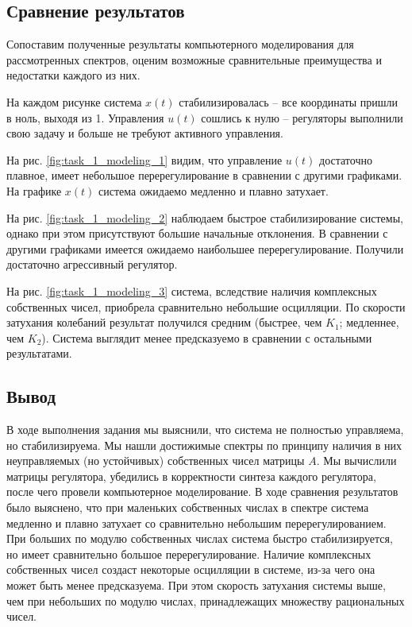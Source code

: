 \documentclass[a4paper, 12pt]{article}
\begin{document}
    \subsection{Сравнение результатов}
    Сопоставим полученные результаты компьютерного моделирования для рассмотренных спектров,
    оценим возможные сравнительные преимущества и недостатки каждого из них.


    На каждом рисунке система $x(t)$ стабилизировалась -- все координаты пришли в ноль, выходя из 1.
    Управления $u(t)$ сошлись к нулю -- регуляторы выполнили свою задачу и больше не требуют
    активного управления.
    

    На рис. \ref{fig:task_1_modeling_1} видим, что управление $u(t)$ достаточно плавное,
    имеет небольшое перерегулирование в сравнении с другими графиками.
    На графике $x(t)$ система ожидаемо медленно и плавно затухает.


    На рис. \ref{fig:task_1_modeling_2} наблюдаем быстрое стабилизирование системы, однако при
    этом присутствуют большие начальные отклонения. В сравнении с другими графиками имеется
    ожидаемо наибольшее перерегулирование. Получили достаточно агрессивный регулятор.


    На рис. \ref{fig:task_1_modeling_3} система, вследствие наличия комплексных собственных чисел,
    приобрела сравнительно небольшие осцилляции. По скорости затухания колебаний результат получился средним
    (быстрее, чем $K_1$; медленнее, чем $K_2$). Система выглядит менее предсказуемо в сравнении с остальными результатами.


    \subsection{Вывод}
    В ходе выполнения задания мы выяснили, что система не полностью управляема, но стабилизируема.
    Мы нашли достижимые спектры по принципу наличия в них неуправляемых (но устойчивых) собственных чисел
    матрицы $A$. Мы вычислили матрицы регулятора, убедились в корректности синтеза каждого регулятора, после чего
    провели компьютерное моделирование. В ходе сравнения результатов было выяснено, что при маленьких собственных
    числах в спектре система медленно и плавно затухает со сравнительно небольшим перерегулированием. При больших
    по модулю собственных числах система быстро стабилизируется, но имеет сравнительно большое перерегулирование.
    Наличие комплексных собственных чисел создаст некоторые осцилляции в системе, из-за чего она может быть менее
    предсказуема. При этом скорость затухания системы выше, чем при небольших по модулю числах, принадлежащих множеству рациональных чисел.
\end{document}
